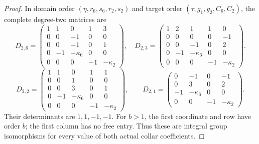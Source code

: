 \begin{proof}
In domain order $(\eta,r_6,s_6,r_2,s_2)$ and target order
$(\tau,g_1,g_2,C_6,C_2)$, the complete degree-two matrices are
\[
 D_{2,6}=\begin{pmatrix}
1&1&0&1&3\\0&0&-1&0&0\\0&0&-1&0&1\\
0&-1&-\kappa_6&0&0\\0&0&0&-1&-\kappa_2
\end{pmatrix},\quad
 D_{2,3}=\begin{pmatrix}
1&2&1&1&0\\0&0&0&0&-1\\0&0&-1&0&2\\
0&-1&-\kappa_6&0&0\\0&0&0&-1&-\kappa_2
\end{pmatrix}.                                                  \tag{F46.16}
\]
\[
 D_{2,2}=\begin{pmatrix}
1&1&0&1&1\\0&0&1&0&0\\0&0&3&0&1\\
0&-1&-\kappa_6&0&0\\0&0&0&-1&-\kappa_2
\end{pmatrix},\qquad
 D_{2,1}=\begin{pmatrix}
0&-1&0&-1\\0&3&0&2\\-1&-\kappa_6&0&0\\
0&0&-1&-\kappa_2
\end{pmatrix}.                                                  \tag{F46.17}
\]
Their determinants are $1,1,-1,-1$. For $b>1$, the first
coordinate and row have order $b$; the first column has no
free entry. Thus these are integral group isomorphisms for
every value of both actual collar coefficients.


\end{proof}
